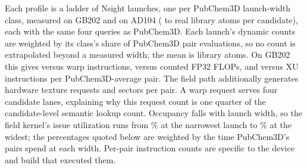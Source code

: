 Each profile is a ladder of \RooflineLadderLaunches{} Nsight launches, one per
PubChem3D launch-width class, measured on GB202 and on AD104 (\RooflineLadderMinLibraryAtoms{} to
\RooflineLadderMaxLibraryAtoms{} real library atoms per candidate), each with the
same four queries as PubChem3D. Each launch's dynamic counts are weighted by its
class's share of PubChem3D pair evaluations, so no count is extrapolated beyond a
measured width; the mean is \RooflineDfiveMeanLibraryAtoms{} library atoms. On GB202 this gives
\RooflineFieldWarpInstructionsPerPair{} versus
\RooflineAnalyticWarpInstructionsPerPair{} warp instructions,
\RooflineFieldFpFlopsPerPair{} versus \RooflineAnalyticFpFlopsPerPair{} counted
FP32 FLOPs, and \RooflineFieldXuInstructionsPerPair{} versus
\RooflineAnalyticXuInstructionsPerPair{} XU instructions per PubChem3D-average pair.
The field path additionally generates \RooflineFieldTextureRequestsPerPair{}
hardware texture requests and \RooflineFieldTextureSectorsPerPair{} sectors per
pair. A warp request serves four candidate lanes, explaining why this request
count is one quarter of the candidate-level semantic lookup count. Occupancy
falls with launch width, so the field kernel's issue utilization runs from
\RooflineFieldIssueNarrowestPercent\% at the narrowest launch to
\RooflineFieldIssueWidestPercent\% at the widest; the percentages quoted below
are weighted by the time PubChem3D's pairs spend at each width. Per-pair
instruction counts are specific to the device and build that executed them.

